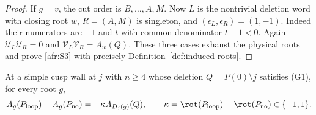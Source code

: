 \begin{proof}
If $g=v$, the cut order is $B,\ldots,A,M$.  Now $L$ is the
nontrivial deletion word with closing root $w$, $R=(A,M)$ is
singleton, and $(\epsilon_L,\epsilon_R)=(1,-1)$.
Indeed their numerators are $-1$ and $t$ with common denominator
$t-1<0$.  Again $\mathcal U_L\mathcal U_R=0$ and $\mathcal V_L\mathcal V_R=A_w(Q)$.
These three cases exhaust the physical roots and prove
\eqref{afr:S3} with precisely Definition~\ref{def:induced-roots}.
\end{proof}

\begin{theorem}\label{thm:A-S4}\leanok
At a simple cusp wall at $j$ with $n\geq4$ whose deletion
$Q=P(0)\setminus j$ satisfies (G1), for every root $g$,
\begin{equation}\label{afr:S4}
A_g(P_{\rm loop})-A_g(P_{\rm no})
=-\kappa A_{D_j(g)}(Q),\qquad
\kappa=\rot(P_{\rm loop})-\rot(P_{\rm no})\in\{-1,1\}.
\end{equation}

\end{theorem}

